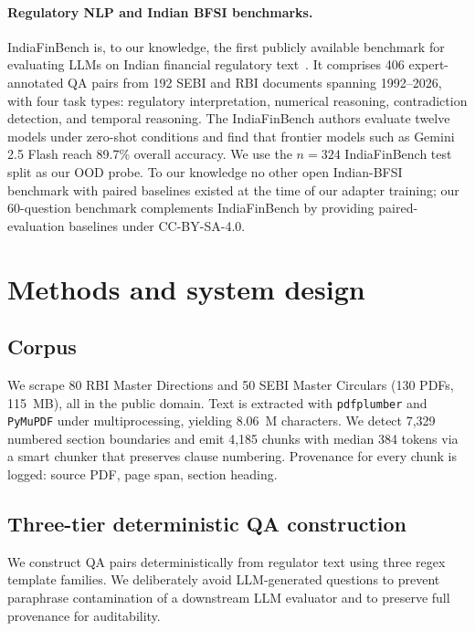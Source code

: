 \documentclass{article}
\begin{document}
\paragraph{Regulatory NLP and Indian BFSI benchmarks.} IndiaFinBench is, to our knowledge, the first publicly available benchmark for evaluating LLMs on Indian financial regulatory text~\citep{pall2026indiafinbench}. It comprises 406 expert-annotated QA pairs from 192 SEBI and RBI documents spanning 1992--2026, with four task types: regulatory interpretation, numerical reasoning, contradiction detection, and temporal reasoning. The IndiaFinBench authors evaluate twelve models under zero-shot conditions and find that frontier models such as Gemini 2.5 Flash reach 89.7\% overall accuracy. We use the $n{=}324$ IndiaFinBench test split as our OOD probe. To our knowledge no other open Indian-BFSI benchmark with paired baselines existed at the time of our adapter training; our 60-question benchmark complements IndiaFinBench by providing paired-evaluation baselines under CC-BY-SA-4.0.

\section{Methods and system design}
\label{sec:methods}

\subsection{Corpus}

We scrape 80 RBI Master Directions and 50 SEBI Master Circulars (130 PDFs, 115~MB), all in the public domain. Text is extracted with \texttt{pdfplumber} and \texttt{PyMuPDF} under multiprocessing, yielding 8.06~M characters. We detect 7{,}329 numbered section boundaries and emit 4{,}185 chunks with median 384 tokens via a smart chunker that preserves clause numbering. Provenance for every chunk is logged: source PDF, page span, section heading.

\subsection{Three-tier deterministic QA construction}

We construct QA pairs deterministically from regulator text using three regex template families. We deliberately avoid LLM-generated questions to prevent paraphrase contamination of a downstream LLM evaluator and to preserve full provenance for auditability.
\end{document}
